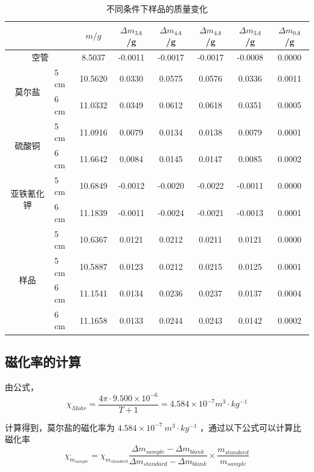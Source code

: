 \documentclass[cn,hazy,pku,12pt,normal,math=newtx,cite=super]{elegantnote}
\begin{document}
\begin{table}[h]
    \centering
    \caption{不同条件下样品的质量变化}
    \label{02}
    \begin{tabular}{clcccccc}
    \hline
                           & \multicolumn{1}{c}{} & $m/g$   & $\Delta m_{3A}$/g & $\Delta m_{4A}$/g & $\Delta m_{4A}$/g & $\Delta m_{3A}$/g & $\Delta m_{0A}$/g \\ \hline
    \multicolumn{2}{c}{空管}      & 8.5037  & -0.0011&	-0.0017	&-0.0017	&-0.0008&	0.0000 \\ \hline
    \multirow{2}{*}{莫尔盐} & 5 cm & 10.5620 & 0.0330  & 0.0575  & 0.0576  & 0.0336  & 0.0011 \\
                         & 6 cm & 11.0332 & 0.0349  & 0.0612  & 0.0618  & 0.0351  & 0.0005 \\ \hline
    \multirow{2}{*}{硫酸铜} & 5 cm & 11.0916 & 0.0079  & 0.0134  & 0.0138  & 0.0079  & 0.0001 \\
                         & 6 cm & 11.6642 & 0.0084  & 0.0145  & 0.0147  & 0.0085  & 0.0002 \\ \hline
    \multirow{2}{*}{亚铁氰化钾} & 5 cm                 & 10.6849 & -0.0012           & -0.0020           & -0.0022           & -0.0011           & 0.0000            \\
                         & 6 cm & 11.1839 & -0.0011 & -0.0024 & -0.0021 & -0.0013 & 0.0001 \\ \hline
    \multirow{4}{*}{样品}  & 5 cm & 10.6367 & 0.0121  & 0.0212  & 0.0211  & 0.0121  & 0.0000 \\
                         & 5 cm & 10.5887 & 0.0123  & 0.0212  & 0.0215  & 0.0125  & 0.0001 \\
                         & 6 cm & 11.1541 & 0.0134  & 0.0236  & 0.0237  & 0.0137  & 0.0004 \\
                         & 6 cm & 11.1658 & 0.0133  & 0.0244  & 0.0243  & 0.0142  & 0.0002 \\ \hline
    \end{tabular}
\end{table}
\subsection[short]{磁化率的计算}
由公式，
$$
\chi_{Mohr} = \frac{4 \pi \cdot 9.500 \times 10^{-6}}{T+1} = 4.584 \times 10^{-7} m^3\cdot kg^{-1}
$$

计算得到，莫尔盐的磁化率为 $ 4.584 \times 10^{-7}\ m^3\cdot kg^{-1} $
，通过以下公式可以计算比磁化率
$$
\chi^,_{m_{sample}} = \chi_{m_{standard}}\frac{\Delta m_{sample} - \Delta m_{blank}}{ \Delta m_{standard} - \Delta m_{blank}}\times \frac{m_{standard}}{m_{sample}} 
$$
\end{document}
